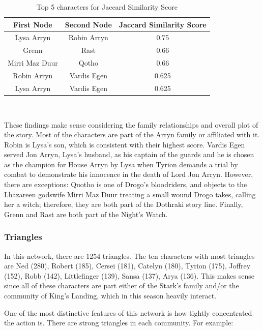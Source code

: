 \documentclass[10pt,twocolumn,letterpaper]{article}
\begin{document}
\begin{table}[]
    \centering
    \small
    \begin{tabular}{c|c|c}
        First Node & Second Node & \small{Jaccard Similarity Score}  \\
        \hline
        Lysa Arryn & Robin Arryn & 0.75 \\
        Grenn & Rast & 0.66 \\
        Mirri Maz Duur & Qotho & 0.66 \\
        Robin Arryn & Vardis Egen & 0.625 \\
        Lysa Arryn & Vardis Egen & 0.625 \\     
        \hline 
    \end{tabular} \\
    \caption{Top 5 characters for Jaccard Similarity Score}
    \label{tab:my_label}
\end{table}

These findings make sense considering the family relationships and overall plot of the story. Most of the characters are part of the Arryn family or affiliated with it. Robin is Lysa's son, which is consistent with their highest score. Vardis Egen served Jon Arryn, Lysa's husband, as his captain of the guards and he is chosen as the champion for House Arryn by Lysa when Tyrion demands a trial by combat to demonstrate his innocence in the death of Lord Jon Arryn. 
However, there are exceptions: Quotho is one of Drogo's bloodriders, and objects to the Lhazareen godswife Mirri Maz Duur treating a small wound Drogo takes, calling her a witch; therefore, they are both part of the Dothraki story line. Finally, Grenn and Rast are both part of the Night's Watch.


\subsubsection{Triangles}

In this network, there are 1254 triangles. The ten characters with most triangles are
Ned (280), Robert (185), Cersei (181), Catelyn	(180), Tyrion (175), Joffrey (152), Robb (142), Littlefinger (139), Sansa (137), Arya (136). This makes sense since all of these characters are part either of the Stark's family and/or the community of King's Landing, which in this season heavily interact.

One of the most distinctive features of this network is how tightly concentrated the action is. There are strong triangles in each community. For example:
\end{document}
